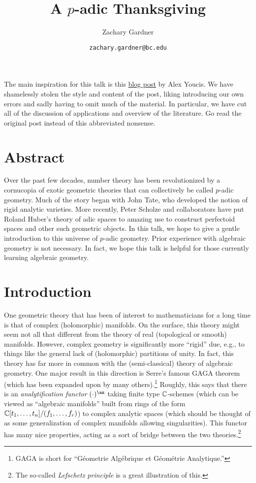 \documentclass[11pt]{article}
\begin{document}
\title{A $p$-adic Thanksgiving}
\author{Zachary Gardner}
\date{\texttt{zachary.gardner@bc.edu}}
\maketitle 

\thispagestyle{fancydate}

The main inspiration for this talk is this \href{https://ayoucis.wordpress.com/2020/09/11/a-taster-on-rigid-geometry-pt-i-the-tate-perspective/#more-15092}{blog post} by Alex Youcis. We have shamelessly stolen the style and content of the post, liking introducing our own errors and sadly having to omit much of the material. In particular, we have cut all of the discussion of applications and overview of the literature. Go read the original post instead of this abbreviated nonsense.

\section{Abstract}
Over the past few decades, number theory has been revolutionized by a cornucopia of exotic geometric theories that can collectively be called $p$-adic geometry. Much of the story began with John Tate, who developed the notion of rigid analytic varieties. More recently, Peter Scholze and collaborators have put Roland Huber's theory of adic spaces to amazing use to construct perfectoid spaces and other such geometric objects. In this talk, we hope to give a gentle introduction to this universe of $p$-adic geometry. Prior experience with algebraic geometry is not necessary. In fact, we hope this talk is helpful for those currently learning algebraic geometry.

\section{Introduction}
One geometric theory that has been of interest to mathematicians for a long time is that of complex (holomorphic) manifolds. On the surface, this theory might seem not all that different from the theory of real (topological or smooth) manifolds. However, complex geometry is significantly more ``rigid'' due, e.g., to things like the general lack of (holomorphic) partitions of unity. In fact, this theory has far more in common with the (semi-classical) theory of algebraic geometry. One major result in this direction is Serre's famous GAGA theorem (which has been expanded upon by many others).\footnote{GAGA is short for ``G\'{e}ometrie Alg\'{e}brique et G\'{e}om\'{e}trie Analytique.''} Roughly, this says that there is an \emph{analytification functor} $(\cdot)^{\an}$ taking finite type $\mathbb{C}$-schemes (which can be viewed as ``algebraic manifolds'' built from rings of the form $\mathbb{C}[t_1,\ldots,t_n]/(f_1,\ldots,f_r)$) to complex analytic spaces (which should be thought of as some generalization of complex manifolds allowing singularities). This functor has many nice properties, acting as a sort of bridge between the two theories.\footnote{The so-called \emph{Lefschetz principle} is a great illustration of this.} 
\end{document}
